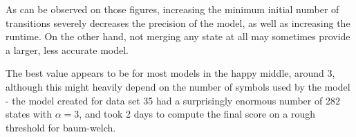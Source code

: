 As can be observed on those figures, increasing the minimum initial number of transitions severely decreases the precision of the model, as well as increasing the runtime. On the other hand, not merging any state at all may sometimes provide a larger, less accurate model.

The best value appears to be for most models in the happy middle, around 3, although this might heavily depend on the number of symbols used by the model - the model created for data set 35 had a surprisingly enormous number of 282 states with $\alpha = 3$, and took 2 days to compute the final score on a rough threshold for \gls{baum-welch}.